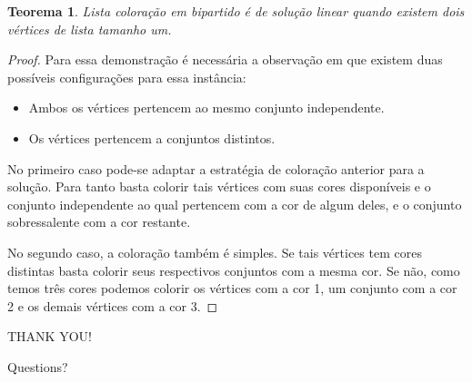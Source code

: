 \documentclass[9pt, compress]{beamer}
\newtheorem{teorema}{Teorema}
\begin{document}
       \begin{frame}
       \begin{teorema}
       Lista coloração em bipartido é de solução linear quando existem dois vértices de lista tamanho um.
       \end{teorema}
       \begin{proof}
        Para essa demonstração é necessária a observação em que existem duas possíveis configurações para essa instância:
        \begin{itemize}
          \item Ambos os vértices pertencem ao mesmo conjunto independente.
          \item Os vértices pertencem a conjuntos distintos.
        \end{itemize} 
        No primeiro caso pode-se adaptar a estratégia de coloração anterior para a solução. Para tanto basta colorir tais vértices com suas cores disponíveis e o conjunto independente ao qual pertencem com a cor de algum deles, e o conjunto sobressalente com a cor restante.
 
        No segundo caso, a coloração também é simples. Se tais vértices tem cores distintas basta colorir seus respectivos conjuntos com a mesma cor. Se não, como temos três cores podemos colorir os vértices com a cor 1, um conjunto com a cor 2 e os demais vértices com a cor 3.
       \end{proof}
     \end{frame}
     \begin{frame}[standout]
       THANK YOU!
       
       Questions?
     \end{frame}
\end{document}
